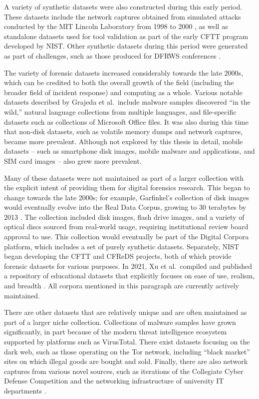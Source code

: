 \documentclass[letterpaper,12pt]{report}
\begin{document}
A variety of synthetic datasets were also constructed during this early
period. These datasets include the network captures obtained from
simulated attacks conducted by the MIT Lincoln Laboratory from 1998 to
2000 \cite{garfinkelForensicCorporaChallenge2007}, as well as
standalone datasets used for tool validation as part of the early CFTT
program developed by NIST. Other synthetic datasets during this period
were generated as part of challenges, such as those produced for DFRWS
conferences \cite{woodsCreatingRealisticCorpora2011}.

The variety of forensic datasets increased considerably towards the late
2000s, which can be credited to both the overall growth of the field
(including the broader field of incident response) and computing as a
whole. Various notable datasets described by Grajeda et al.~include
malware samples discovered ``in the wild,'' natural language collections
from multiple languages, and file-specific datasets such as collections
of Microsoft Office files. It was also during this time that non-disk
datasets, such as volatile memory dumps and network captures, became
more prevalent. Although not explored by this thesis in detail, mobile
datasets -- such as smartphone disk images, mobile malware and
applications, and SIM card images -- also grew more prevalent.

Many of these datasets were not maintained as part of a larger
collection with the explicit intent of providing them for digital
forensics research. This began to change towards the late 2000s; for
example, Garfinkel's collection of disk images would eventually evolve
into the Real Data Corpus, growing to 30 terabytes by 2013
\cite{garfinkelBringingScienceDigital2009a,yannikosDataCorporaDigital2014}.
The collection included disk images, flash drive images, and a variety
of optical discs sourced from real-world usage, requiring institutional
review board approval to use. This collection would eventually be part
of the Digital Corpora platform, which includes a set of purely
synthetic datasets. Separately, NIST began developing the CFTT and
CFReDS projects, both of which provide forensic datasets for various
purposes. In 2021, Xu et al.~compiled and published a repository of
educational datasets that explicitly focuses on ease of use, realism,
and breadth \cite{xuDesigningSharedDigital2022}. All corpora
mentioned in this paragraph are currently actively maintained.

There are other datasets that are relatively unique and are often
maintained as part of a larger niche collection. Collections of malware
samples have grown significantly, in part because of the modern threat
intelligence ecosystem supported by platforms such as VirusTotal. There
exist datasets focusing on the dark web, such as those operating on the
Tor network, including ``black market'' sites on which illegal goods are
bought and sold. Finally, there are also network captures from various
novel sources, such as iterations of the Collegiate Cyber Defense
Competition and the networking infrastructure of university IT
departments \cite{grajedaAvailabilityDatasetsDigital2017}.
\end{document}
